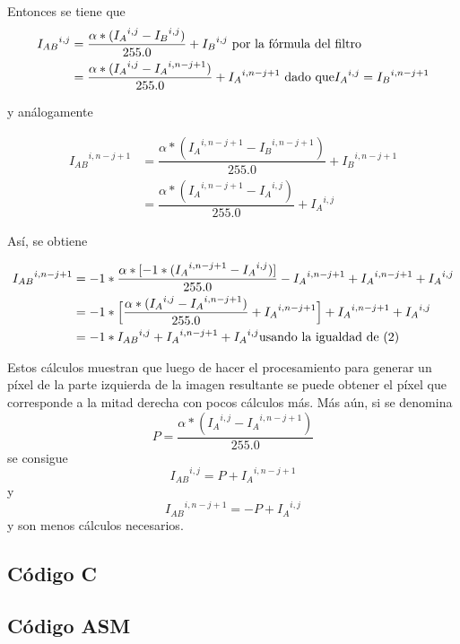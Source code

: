 \par{Entonces se tiene que}
\begin{align}
{I_{AB}}^{i,j} &= \dfrac{\alpha * ( {I_{A}}^{i,j} - {I_{B}}^{i,j} )}{255.0} + {I_{B}}^{i,j} \textup{     por la fórmula del filtro} \nonumber \\
&= \dfrac{\alpha * ( {I_{A}}^{i,j} - {I_{A}}^{i,n - j + 1} )}{255.0} + {I_{A}}^{i,n - j + 1} \textup{    dado que} {I_{A}}^{i,j} = {I_{B}}^{i,n - j + 1}
\end{align}

y análogamente

\begin{align}
{I_{AB}}^{i,n - j + 1} &= \dfrac{\alpha * ( {I_{A}}^{i,n - j + 1} - {I_{B}}^{i,n - j +1} )}{255.0} + {I_{B}}^{i,n - j + 1}  \nonumber \\
&= \dfrac{\alpha * ( {I_{A}}^{i,n - j + 1} - {I_{A}}^{i,j} )}{255.0} + {I_{A}}^{i,j}
\end{align}

\par{Así, se obtiene}

\begin{align}
{I_{AB}}^{i,n - j + 1} &= -1 * \dfrac{\alpha * [-1 * ( {I_{A}}^{i,n - j + 1} - {I_{A}}^{i,j} )]}{255.0} - {I_{A}}^{i,n - j + 1} + {I_{A}}^{i,n - j + 1} + {I_{A}}^{i,j} \nonumber \\
&= -1 * \Big[ \dfrac{\alpha * ( {I_{A}}^{i,j} - {I_{A}}^{i,n - j + 1} )}{255.0} + {I_{A}}^{i,n - j + 1} \Big] + {I_{A}}^{i,n - j + 1} + {I_{A}}^{i,j} \nonumber \\
&= -1 * {I_{AB}}^{i,j} + {I_{A}}^{i,n - j + 1} + {I_{A}}^{i,j} \textup{usando la igualdad de (2)}
\end{align}

\par{Estos cálculos muestran que luego de hacer el procesamiento para generar un píxel de la parte izquierda de la imagen resultante se puede obtener el píxel que corresponde a la mitad derecha con pocos cálculos más. Más aún, si se denomina}
\[ P = \dfrac{\alpha * ( {I_{A}}^{i,j} - {I_{A}}^{i,n - j + 1} )}{255.0} \]
se consigue
\[ {I_{AB}}^{i,j} = P + {I_{A}}^{i,n - j + 1} \]
y
\[ {I_{AB}}^{i,n - j + 1} = -P + {I_{A}}^{i,j} \]
y son menos cálculos necesarios.

\subsection{Código C}
	
\subsection{Código ASM}
\par{}
	
